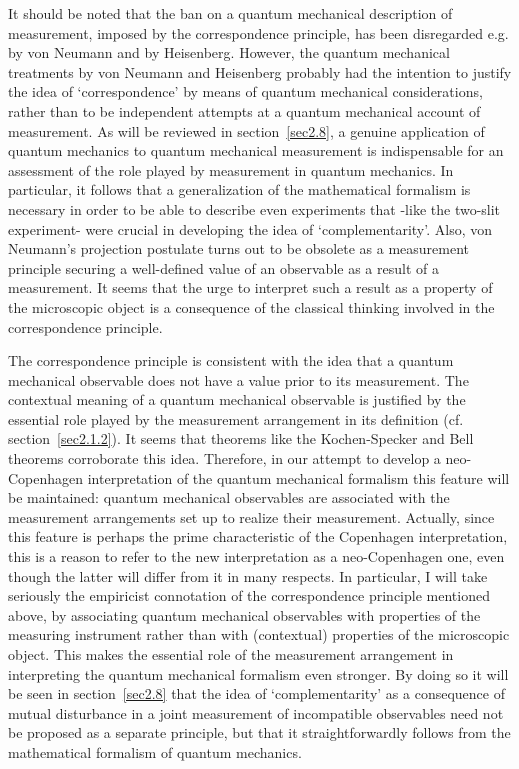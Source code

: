 \documentclass[12pt]{article}
\begin{document}
It should be noted that the ban on a quantum mechanical
description of measurement, imposed by the correspondence
principle, has been disregarded e.g. by von Neumann and by
Heisenberg. However, the quantum mechanical treatments by von
Neumann and Heisenberg probably had the intention to justify the
idea of `correspondence' by means of quantum mechanical
considerations, rather than to be independent attempts at a
quantum mechanical account of measurement. As will be reviewed in
section~\ref{sec2.8}, a genuine application of quantum mechanics
to quantum mechanical measurement is indispensable for an
assessment of the role played by measurement in quantum mechanics.
In particular, it follows that a generalization of the
mathematical formalism is necessary in order to be able to
describe even experiments that -like the two-slit experiment- were
crucial in developing the idea of `complementarity'. Also, von
Neumann's projection postulate turns out to be obsolete as a
measurement principle securing a well-defined value of an
observable as a result of a measurement. It seems that the urge to
interpret such a result as a property of the microscopic object is
a consequence of the classical thinking involved in the
correspondence principle.

The correspondence principle is consistent with the idea that a
quantum mechanical observable does not have a value prior to its
measurement. The contextual meaning of a quantum mechanical
observable is justified by the essential role played by the
measurement arrangement in its definition (cf.
section~\ref{sec2.1.2}). It seems that theorems like the
Kochen-Specker and Bell theorems corroborate this idea. Therefore,
in our attempt to develop a neo-Copenhagen interpretation of the
quantum mechanical formalism this feature will be maintained:
quantum mechanical observables are associated with the measurement
arrangements set up to realize their measurement. Actually, since
this feature is perhaps the prime characteristic of the Copenhagen
interpretation, this is a reason to refer to the new
interpretation as a neo-Copenhagen one, even though the latter
will differ from it in many respects. In particular, I will take
seriously the empiricist connotation of the correspondence
principle mentioned above, by associating quantum mechanical
observables with properties of the measuring instrument rather
than with (contextual) properties of the microscopic object. This
makes the essential role of the measurement arrangement in
interpreting the quantum mechanical formalism even stronger. By
doing so it will be seen in section~\ref{sec2.8} that the idea of
`complementarity' as a consequence of mutual disturbance in a
joint measurement of incompatible observables need not be proposed
as a separate principle, but that it straightforwardly follows
from the mathematical formalism of quantum mechanics.
\end{document}
